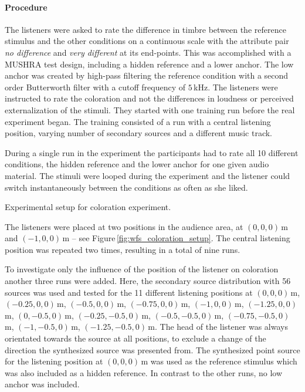 \paragraph{Procedure}
%
The listeners were asked to rate the difference in timbre between the
reference stimulus and the other conditions on a continuous scale with
the attribute pair \emph{no difference} and \emph{very different} at its
end-points. This was accomplished with a {\small MUSHRA}
test design, including a hidden reference and a lower anchor.
The low anchor was created by high-pass
filtering the reference condition with a second order Butterworth filter with a cutoff
frequency of $5$\,kHz. The listeners were instructed to rate the
coloration and not the differences in loudness or perceived externalization of
the stimuli.
They started with one training run before the real experiment began. The
training consisted of a run with a central listening position, varying number of
secondary sources and a different music track.

During a single run in the experiment the participants had to rate all
10 different conditions, the hidden
reference and the lower anchor for one given audio material.
The stimuli were looped during the experiment and the listener could
switch instantaneously between the conditions as often as she liked.
%
\begin{marginfigure}
    \ft
    \centering
    
    \caption{Experimental setup for coloration experiment.
    }
    \label{fig:wfs_coloration_setup}
\end{marginfigure}
%
The listeners were placed at two positions in the audience area, at
$(0,0,0)$\,m and $(-1,0,0)$\,m -- see Figure\,\ref{fig:wfs_coloration_setup}.
The central listening position was repeated two times, resulting in a total of
nine runs.

To investigate only the influence of the position of the listener
on coloration another three runs were added. Here, the secondary source distribution
with 56 sources was used and
tested for the 11 different listening positions at $(0,0,0)$\,m, $(-0.25,0,0)$\,m,
$(-0.5,0,0)$\,m, $(-0.75,0,0)$\,m, $(-1,0,0)$\,m, $(-1.25,0,0)$\,m,
$(0,-0.5,0)$\,m, $(-0.25,-0.5,0)$\,m, $(-0.5,-0.5,0)$\,m,
$(-0.75,-0.5,0)$\,m, $(-1,-0.5,0)$\,m, $(-1.25,-0.5,0)$\,m. The head of the
listener was always orientated towards the source at all positions, to exclude a
change of the direction the synthesized source was presented from.
The synthesized point source for the listening
position at $(0,0,0)$\,m was used as the reference stimulus which was also
included as a hidden reference. In contrast to the other runs,
no low anchor was included.

